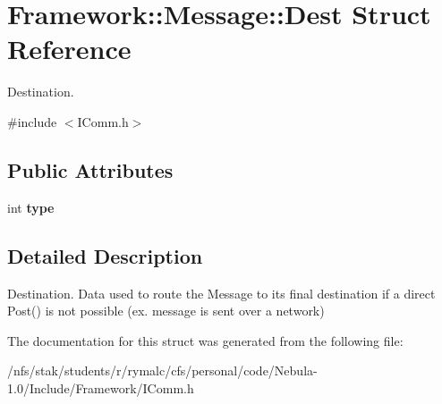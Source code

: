 \hypertarget{structFramework_1_1Message_1_1Dest}{
\section{Framework::Message::Dest Struct Reference}
\label{structFramework_1_1Message_1_1Dest}
}


Destination.  


{\ttfamily \#include $<$IComm.h$>$}\subsection*{Public Attributes}
\begin{DoxyCompactItemize}
\item 
\hypertarget{structFramework_1_1Message_1_1Dest_a3b7ec2126c2fe381ea8bc8fb62275eb4}{
int {\bfseries type}}
\label{structFramework_1_1Message_1_1Dest_a3b7ec2126c2fe381ea8bc8fb62275eb4}

\end{DoxyCompactItemize}


\subsection{Detailed Description}
Destination. Data used to route the Message to its final destination if a direct Post() is not possible (ex. message is sent over a network) 

The documentation for this struct was generated from the following file:\begin{DoxyCompactItemize}
\item 
/nfs/stak/students/r/rymalc/cfs/personal/code/Nebula-\/1.0/Include/Framework/IComm.h\end{DoxyCompactItemize}
